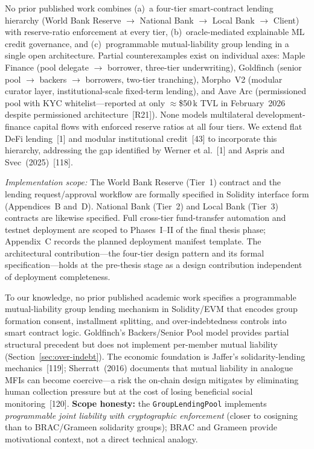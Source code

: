 \documentclass[12pt,a4paper]{report}
\begin{document}
\begin{description}[leftmargin=0pt]

\item[\textbf{Contribution 1 --- Four-Tier Hierarchical DeFi Architecture.}]
No prior published work combines (a)~a four-tier smart-contract lending hierarchy (World Bank Reserve $\to$ National Bank $\to$ Local Bank $\to$ Client) with reserve-ratio enforcement at every tier, (b)~oracle-mediated explainable ML credit governance, and (c)~programmable mutual-liability group lending in a single open architecture. Partial counterexamples exist on individual axes: Maple Finance (pool delegate $\to$ borrower, three-tier underwriting), Goldfinch (senior pool $\to$ backers $\to$ borrowers, two-tier tranching), Morpho~V2 (modular curator layer, institutional-scale fixed-term lending), and Aave Arc (permissioned pool with KYC whitelist---reported at only $\approx$\$50\,k TVL in February~2026 despite permissioned architecture~[R21]). None models multilateral development-finance capital flows with enforced reserve ratios at all four tiers. We extend flat DeFi lending~[1] and modular institutional credit~[43] to incorporate this hierarchy, addressing the gap identified by Werner et al.~[1] and Aspris and Svec~(2025)~[118].

\textit{Implementation scope:} The World Bank Reserve (Tier~1) contract and the lending request/approval workflow are formally specified in Solidity interface form (Appendices~B and~D). National Bank (Tier~2) and Local Bank (Tier~3) contracts are likewise specified. Full cross-tier fund-transfer automation and testnet deployment are scoped to Phases~I--II of the final thesis phase; Appendix~C records the planned deployment manifest template. The architectural contribution---the four-tier design pattern and its formal specification---holds at the pre-thesis stage as a design contribution independent of deployment completeness.

\item[\textbf{Contribution 2 --- On-Chain Solidarity Group Lending.}]
To our knowledge, no prior published academic work specifies a programmable mutual-liability group lending mechanism in Solidity/EVM that encodes group formation consent, installment splitting, and over-indebtedness controls into smart contract logic. Goldfinch's Backers/Senior Pool model provides partial structural precedent but does not implement per-member mutual liability (Section~\ref{sec:over-indebt}). The economic foundation is Jaffer's solidarity-lending mechanics~[119]; Sherratt~(2016) documents that mutual liability in analogue MFIs can become coercive---a risk the on-chain design mitigates by eliminating human collection pressure but at the cost of losing beneficial social monitoring~[120]. \textbf{Scope honesty:} the \texttt{GroupLendingPool} implements \textit{programmable joint liability with cryptographic enforcement} (closer to cosigning than to BRAC/Grameen solidarity groups); BRAC and Grameen provide motivational context, not a direct technical analogy.


\end{description}
\end{document}
